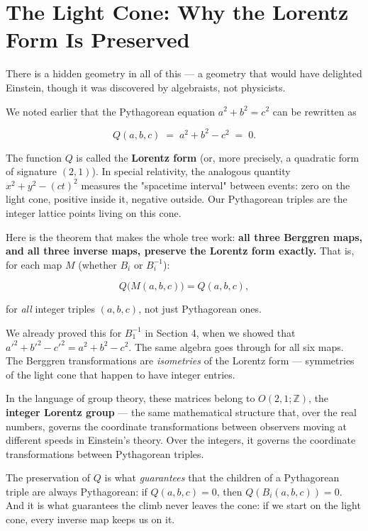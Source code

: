 \bigskip


\section{The Light Cone: Why the Lorentz Form Is Preserved}

There is a hidden geometry in all of this --- a geometry that would have delighted Einstein, though it was discovered by algebraists, not physicists.

We noted earlier that the Pythagorean equation $a^2 + b^2 = c^2$ can be rewritten as

\[
Q(a, b, c) \;=\; a^2 + b^2 - c^2 \;=\; 0.
\]

The function $Q$ is called the \textbf{Lorentz form} (or, more precisely, a quadratic form of signature $(2,1)$). In special relativity, the analogous quantity $x^2 + y^2 - (ct)^2$ measures the "spacetime interval" between events: zero on the light cone, positive inside it, negative outside. Our Pythagorean triples are the integer lattice points living on this cone.

Here is the theorem that makes the whole tree work: \textbf{all three Berggren maps, and all three inverse maps, preserve the Lorentz form exactly.} That is, for each map $M$ (whether $B_i$ or $B_i^{-1}$):

\[
Q\bigl(M(a, b, c)\bigr) = Q(a, b, c),
\]

for \textit{all} integer triples $(a, b, c)$, not just Pythagorean ones.

We already proved this for $B_1^{-1}$ in Section 4, when we showed that ${a'}^2 + {b'}^2 - {c'}^2 = a^2 + b^2 - c^2$. The same algebra goes through for all six maps. The Berggren transformations are \textit{isometries} of the Lorentz form --- symmetries of the light cone that happen to have integer entries.

In the language of group theory, these matrices belong to $O(2,1;\mathbb{Z})$, the \textbf{integer Lorentz group} --- the same mathematical structure that, over the real numbers, governs the coordinate transformations between observers moving at different speeds in Einstein's theory. Over the integers, it governs the coordinate transformations between Pythagorean triples.

The preservation of $Q$ is what \textit{guarantees} that the children of a Pythagorean triple are always Pythagorean: if $Q(a,b,c) = 0$, then $Q(B_i(a,b,c)) = 0$. And it is what guarantees the climb never leaves the cone: if we start on the light cone, every inverse map keeps us on it.

